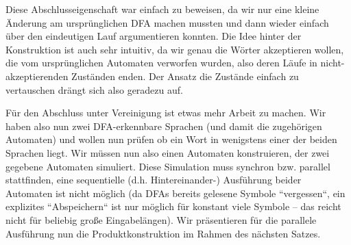 \documentclass[11pt, a4paper]{article}
\theoremstyle{definition}
\theoremstyle{plain}
\numberwithin{equation}{section}
\begin{document}
Diese Abschlusseigenschaft war einfach zu beweisen, da wir nur eine kleine Änderung am ursprünglichen DFA machen mussten und dann wieder einfach über den eindeutigen Lauf argumentieren konnten. Die Idee hinter der Konstruktion ist auch sehr intuitiv, da wir genau die Wörter akzeptieren wollen, die vom ursprünglichen Automaten verworfen wurden, also deren Läufe in nicht-akzeptierenden Zuständen enden. Der Ansatz die Zustände einfach zu vertauschen drängt sich also geradezu auf.\par
Für den Abschluss unter Vereinigung ist etwas mehr Arbeit zu machen. Wir haben also nun zwei DFA-erkennbare Sprachen (und damit die zugehörigen Automaten) und wollen nun prüfen ob ein Wort in wenigstens einer der beiden Sprachen liegt. Wir müssen nun also einen Automaten konstruieren, der zwei gegebene Automaten simuliert. Diese Simulation muss synchron bzw. parallel stattfinden, eine sequentielle (d.h. Hintereinander-) Ausführung beider Automaten ist nicht möglich (da DFAs bereits gelesene Symbole ``vergessen``, ein explizites ``Abspeichern`` ist nur möglich für konstant viele Symbole -- das reicht nicht für beliebig große Eingabelängen). Wir präsentieren für die parallele Ausführung nun die Produktkonstruktion im Rahmen des nächsten Satzes.
\end{document}
